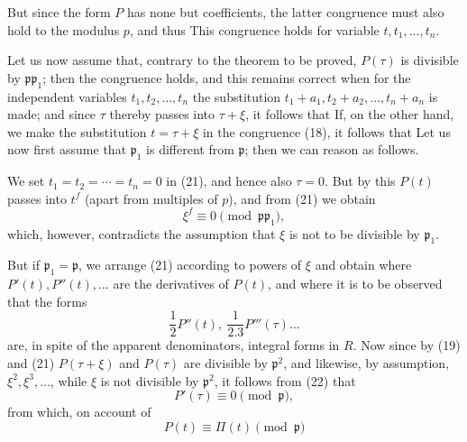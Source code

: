 But since the form $P$ has none but  coefficients, the latter congruence must also hold to the modulus $p$, and thus
This congruence holds for variable $t, t_1, \ldots, t_n$.

Let us now assume that, contrary to the theorem to be proved, $P(\tau)$ is divisible by $\mathfrak p \mathfrak p_1$; then the congruence
holds, and this remains correct when for the independent variables $t_1, t_2, \ldots, t_n$ the substitution $t_1+a_1, t_2+a_2, \ldots, t_n+a_n$ is made; and since $\tau$ thereby passes into $\tau+\xi$, it follows that
If, on the other hand, we make the substitution $t=\tau+\xi$ in the congruence (18), it follows that
Let us now first assume that $\mathfrak p_1$ is different from $\mathfrak p$; then we can reason as follows.

We set $t_1=t_2=\cdots=t_n=0$ in (21), and hence also $\tau=0$. But by this $P(t)$ passes into $t^f$ (apart from multiples of $p$), and from (21) we obtain
\[ \xi^f \equiv 0 \pmod{\mathfrak p \mathfrak p_1}, \]
which, however, contradicts the assumption that $\xi$ is not to be divisible by $\mathfrak p_1$.

But if $\mathfrak p_1 = \mathfrak p$, we arrange (21) according to powers of $\xi$ and obtain
where $P'(t), P''(t), \ldots$ are the derivatives of $P(t)$, and where it is to be observed that the forms
\[ \frac{1}{2} P''(t), \ \frac{1}{2.3} P'''(\tau) \ldots \]
are, in spite of the apparent denominators, integral forms in $R$. Now since by (19) and (21) $P(\tau+\xi)$ and $P(\tau)$ are divisible by $\mathfrak p^2$, and likewise, by assumption, $\xi^2, \xi^3, \ldots$, while $\xi$ is not divisible by $\mathfrak p^2$, it follows from (22) that
\[ P'(\tau) \equiv 0 \pmod{\mathfrak p}, \]
from which, on account of
\[ P(t) \equiv \Pi(t) \pmod{\mathfrak p} \]
